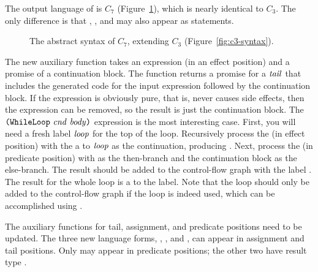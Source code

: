 \documentclass[11pt]{book}
\newcommand{\gray}[1]{{\color{gray} #1}}
\begin{document}
The output language of  is $C_7$
(Figure~\ref{fig:c7-syntax}), which is nearly identical to $C_3$. The
only difference is that , , and
 may also appear as statements.

\begin{figure}[tp]
\fbox{
\begin{minipage}{0.96\textwidth}
\small
\[
\begin{array}{lcl}
\Stmt &::=& \gray{ \ASSIGN{\VAR{\Var}}{\Exp} 
       \mid \LP\key{Collect} \,\itm{int}\RP } \\
     &\mid& \CALL{\Atm}{\LP\Atm\ldots\RP} \mid \READ{}\\
     &\mid& \LP\key{Prim}~\key{'vector-set!}\,\LP\key{list}\,\Atm\,\INT{\Int}\,\Atm\RP\RP \\
\Def &::=& \DEF{\itm{label}}{\LP\LS\Var\key{:}\Type\RS\ldots\RP}{\Type}{\itm{info}}{\LP\LP\itm{label}\,\key{.}\,\Tail\RP\ldots\RP}\\
C_7 & ::= & \PROGRAMDEFS{\itm{info}}{\LP\Def\ldots\RP} 
\end{array}
\]
\end{minipage}
}
\caption{The abstract syntax of $C_7$, extending $C_3$ (Figure~\ref{fig:c3-syntax}).}
\label{fig:c7-syntax}
\end{figure}

The new auxiliary function  takes an expression
(in an effect position) and a promise of a continuation block. The
function returns a promise for a $\mathit{tail}$ that includes the generated
code for the input expression followed by the continuation block.  If
the expression is obviously pure, that is, never causes side effects,
then the expression can be removed, so the result is just the
continuation block.
%
The $\texttt{(}\texttt{WhileLoop}~\mathit{cnd}~\mathit{body}\texttt{)}$ expression is the most interesting
case.  First, you will need a fresh label $\mathit{loop}$ for the top of
the loop.  Recursively process the  (in effect position)
with the a  to $\mathit{loop}$ as the continuation, producing
. Next, process the  (in predicate position) with
 as the then-branch and the continuation block as the
else-branch. The result should be added to the control-flow graph with
the label . The result for the whole  loop is a
 to the  label. Note that the loop should only be
added to the control-flow graph if the loop is indeed used, which can
be accomplished using .

The auxiliary functions for tail, assignment, and predicate positions
need to be updated. The three new language forms, ,
, and , can appear in assignment and tail
positions.  Only  may appear in predicate positions; the
other two have result type .
\end{document}
